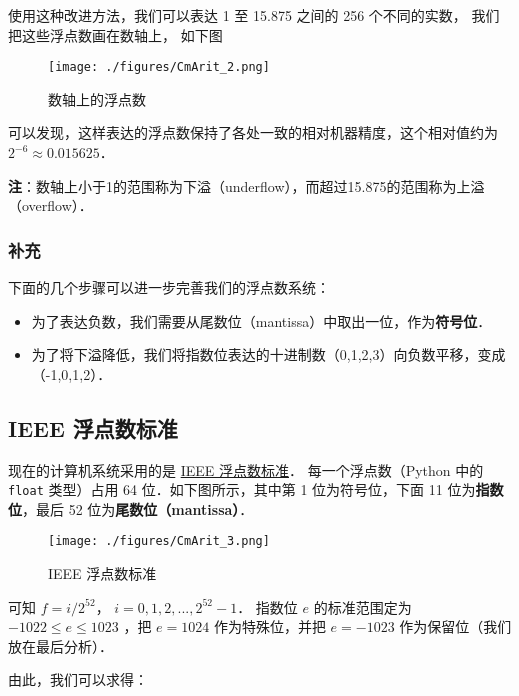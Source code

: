 使用这种改进方法，我们可以表达 1 至 15.875 之间的 256 个不同的实数， 我们把这些浮点数画在数轴上， 如下图

\begin{figure}[ht]
\centering
\texttt{[image: ./figures/CmArit\_2.png]}
\caption{数轴上的浮点数} \label{CmArit_fig2}
\end{figure}

可以发现，这样表达的浮点数保持了各处一致的相对机器精度，这个相对值约为 $2^{-6}\approx 0.015625$．

\textbf{注}：数轴上小于1的范围称为下溢（underflow），而超过15.875的范围称为上溢（overflow）．

\subsubsection{补充}

下面的几个步骤可以进一步完善我们的浮点数系统：
\begin{itemize}
\item 为了表达负数，我们需要从尾数位（mantissa）中取出一位，作为\textbf{符号位}． 
\item 为了将下溢降低，我们将指数位表达的十进制数（0,1,2,3）向负数平移，变成（-1,0,1,2）．
\end{itemize}

\subsection{IEEE 浮点数标准}

现在的计算机系统采用的是 \href{https://ieeexplore.ieee.org/document/8766229}{IEEE 浮点数标准}． 每一个浮点数（Python 中的 \verb|float| 类型）占用 64 位．如下图所示，其中第 1 位为符号位，下面 11 位为\textbf{指数位}，最后 52 位为\textbf{尾数位（mantissa）}．

\begin{figure}[ht]
\centering
\texttt{[image: ./figures/CmArit\_3.png]}
\caption{IEEE 浮点数标准} \label{CmArit_fig3}
\end{figure}

可知 $f= {i}/{2^{52}}$， $i=0,1,2,...,2^{52}-1$． 指数位  $e$  的标准范围定为  $-1022\le e\le 1023$  ，把  $e=1024$  作为特殊位，并把  $e=-1023$  作为保留位（我们放在最后分析）．

由此，我们可以求得：

